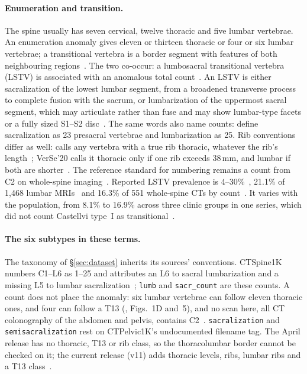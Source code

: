 \paragraph{Enumeration and transition.}
The spine usually has seven cervical, twelve thoracic and five lumbar vertebrae. An
enumeration anomaly gives eleven or thirteen thoracic or four or six lumbar vertebrae; a
transitional vertebra is a border segment with features of both neighbouring
regions~\citep{Moller2026VERIDAH:Sequences,Konin2010LumbosacralRelevance}. The two co-occur: a
lumbosacral transitional vertebra (LSTV) is associated with an anomalous total
count~\citep{Carrino2011EffectImaging}. An LSTV is either
sacralization of the lowest lumbar segment, from a broadened transverse process to complete
fusion with the sacrum, or lumbarization of the uppermost sacral segment, which may
articulate rather than fuse and may show lumbar-type facets or a fully sized S1--S2
disc~\citep{Konin2010LumbosacralRelevance}. The same words also name counts:
\citet{Nagata2025LSTVWholeSpine} define sacralization as 23 presacral vertebrae and
lumbarization as 25. Rib conventions differ as well: \VERIDAH{} calls any vertebra with a true
rib thoracic, whatever the rib's length~\citep{Moller2026VERIDAH:Sequences}; VerSe'20 calls it
thoracic only if one rib exceeds 38\,mm, and lumbar if both are
shorter~\citep{Liebl2021VerSeData}. The reference standard for numbering
remains a count from C2 on whole-spine imaging~\citep{Lian2018LSTVNumeration}. Reported LSTV
prevalence is 4--30\%~\citep{Konin2010LumbosacralRelevance},
21.1\% of 1{,}468 lumbar MRIs~\citep{Hanhivaara2022LSTV} and 16.3\% of 551 whole-spine CTs by
count~\citep{Nagata2025LSTVWholeSpine}. It varies with the population, from 8.1\% to 16.9\%
across three clinic groups in one series, which did not count Castellvi type~I as
transitional~\citep{Sekharappa2014LumbosacralSignificance}.

\paragraph{The six subtypes in these terms.}
The taxonomy of \S\ref{sec:dataset} inherits its sources' conventions. CTSpine1K numbers
C1--L6 as 1--25 and attributes an L6 to sacral lumbarization and a missing L5 to lumbar
sacralization~\citep{Deng2021CTSpine1K:Tomography}; \texttt{lumb} and
\texttt{sacr\_count} are these counts. A count does not place the anomaly: six lumbar
vertebrae can follow eleven thoracic ones, and four can follow a
T13 (\citealp{Moller2026VERIDAH:Sequences}, Figs.~1D and~5), and no scan here, all CT
colonography of the abdomen and pelvis, contains C2~\citep{Schwing2026CTSpinoPelvic1KArxiv}.
\texttt{sacralization} and \texttt{semisacralization} rest on CTPelvic1K's undocumented
filename tag. The April release has no thoracic, T13 or rib class, so the thoracolumbar border
cannot be checked on it; the current release (v11) adds thoracic levels, ribs, lumbar ribs and
a T13 class~\citep{Schwing2026CTSpinoPelvic1KArxiv}.

